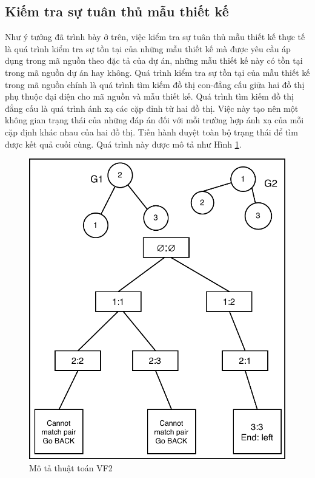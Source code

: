 \documentclass[12pt]{report}
\begin{document}
\subsection{Kiếm tra sự tuân thủ mẫu thiết kế}
Như ý tưởng đã trình bày ở trên, việc kiểm tra sự tuân thủ mẫu thiết kế thực tế là quá trình kiểm tra sự tồn tại của những mẫu thiết kế mà được yêu cầu áp dụng trong mã nguồn theo đặc tả của dự án, những mẫu thiết kế này có tồn tại trong mã nguồn dự án hay không.
Quá trình kiểm tra sự tồn tại của mẫu thiết kế trong mã nguồn chính là quá trình tìm kiếm đồ thị con-đẳng cấu giữa hai đồ thị phụ thuộc đại diện cho mã nguồn và mẫu thiết kế. Quá trình tìm kiếm đồ thị đẳng cấu là quá trình ánh xạ các cặp đỉnh từ hai đồ thị. Việc này tạo nên một không gian trạng thái của những đáp án đối với mỗi trường hợp ánh xạ của mỗi cặp định khác nhau của hai đồ thị. Tiến hành duyệt toàn bộ trạng thái để tìm được kết quả cuối cùng. Quá trình này được mô tả như Hình \ref{fig:vf2_example}.
\begin{figure}[!htbp]
	\centering
	\includegraphics[scale=0.65]{images/_vf2_example.pdf}
	\caption{Mô tả thuật toán VF2}
	\label{fig:vf2_example}
\end{figure}\\
\end{document}
